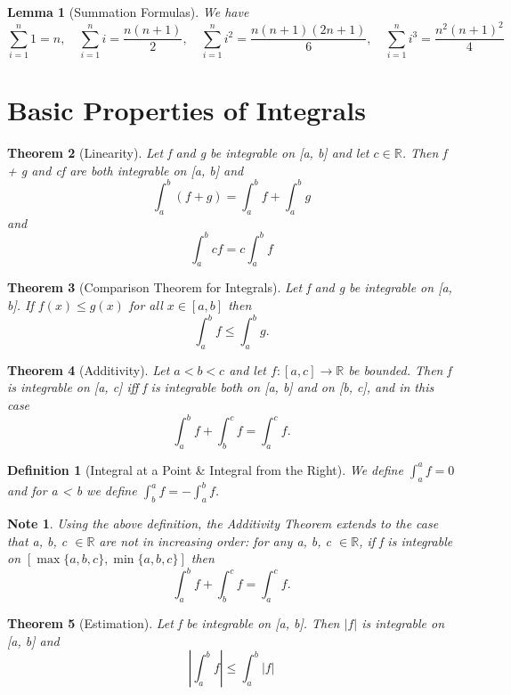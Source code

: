\documentclass[11pt, oneside]{book}
\theoremstyle{break}
\newtheorem{thm}{Theorem}[section]
\newtheorem{lemma}[thm]{Lemma}
\newtheorem*{note}{Note}
\newtheorem{defn}{Definition}[section]
\newcommand{\bb}[1]{\mathbb{#1}}		%
\begin{document}
\begin{lemma}[Summation Formulas]
	We have
	\[
		\sum_{i=1}^{n} 1 = n, \quad \sum_{i = 1}^{n} i = \frac{n(n+1)}{2}, \quad \sum_{i=1}^{n} i^2 = \frac{n(n+1)(2n+1)}{6}, \quad \sum_{i=1}^{n} i^3 = \frac{n^2 (n+1)^2}{4}
	\]
\end{lemma}


\section{Basic Properties of Integrals}

\begin{thm}[Linearity]
	Let f and g be integrable on [a, b] and let $c \in \bb{R}$. Then f + g and cf are both integrable on [a, b] and
	\[
		\int_{a}^{b} (f+g) = \int_{a}^{b} f + \int_{a}^{b} g
	\]
	and
	\[
		\int_{a}^{b} cf = c \int_{a}^{b} f
	\]
\end{thm}

\begin{thm}[Comparison Theorem for Integrals]
	Let f and g be integrable on [a, b]. If $f(x) \leq g(x)$ for all $x \in [a, b]$ then
	\[
		\int_{a}^{b} f \leq \int_{a}^{b} g.
	\]
\end{thm}

\begin{thm}[Additivity]
	Let $a < b < c$ and let $f: [a, c] \to \bb{R}$ be bounded. Then f is integrable on [a, c] iff f is integrable both on [a, b] and on [b, c], and in this case
	\[
		\int_{a}^{b} f + \int_{b}^{c} f = \int_{a}^{c} f.
	\]
\end{thm}

\begin{defn}[Integral at a Point \& Integral from the Right]
	We define $\int_{a}^{a} f = 0$ and for a < b we define $\int_{b}^{a} f = -\int_{a}^{b} f$.
\end{defn}

\begin{note}
	Using the above definition, the Additivity Theorem extends to the case that a, b, c $\in \bb{R}$ are not in increasing order: for any a, b, c $\in \bb{R}$, if f is integrable on $[\max \{a, b, c\}, \min \{a, b, c\}]$ then
	\[
		\int_{a}^{b} f + \int_{b}^{c} f = \int_{a}^{c} f.
	\]
\end{note}

\begin{thm}[Estimation]
	Let f be integrable on [a, b]. Then $|f|$ is integrable on [a, b] and
	\[
		\left|\int_{a}^{b} f \right| \leq \int_{a}^{b} |f|
	\]
\end{thm}
\end{document}
